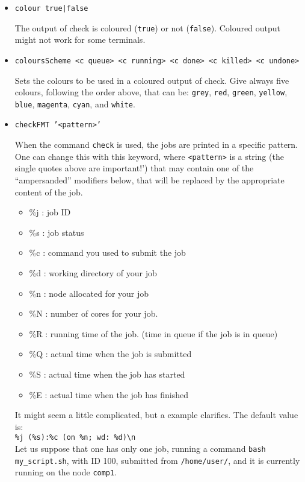 \documentclass[a4paper,12pt]{article}
\begin{document}
\begin{itemize}
\item \texttt{colour true|false}
  
  The output of check is coloured (\texttt{true}) or not (\texttt{false}).
  Coloured output might not work for some terminals.

\item \texttt{coloursScheme <c queue> <c running> <c done> <c killed> <c undone>}

  Sets the colours to be used in a coloured output of check.
  Give always five colours, following the order above, that can be:
  \texttt{grey}, \texttt{red}, \texttt{green}, \texttt{yellow}, \texttt{blue}, \texttt{magenta}, \texttt{cyan}, and \texttt{white}.

\item \texttt{checkFMT '<pattern>'}

  When the command \texttt{check} is used, the jobs are printed in a specific pattern.
  One can change this with this keyword, where \texttt{<pattern>} is a string (the single quotes above are important!') that may contain one of the ``ampersanded'' modifiers below, that will be replaced by the appropriate content of the job.

  \begin{itemize}
  \item \%j : job ID
  \item \%s : job status
  \item \%c : command you used to submit the job
  \item \%d : working directory of your job
  \item \%n : node allocated for your job
  \item \%N : number of cores for your job.
  \item \%R : running time of the job. (time in queue if the job is in queue)
  \item \%Q : actual time when the job is submitted
  \item \%S : actual time when the job has started
  \item \%E : actual time when the job has finished
  \end{itemize}

  It might seem a little complicated, but a example clarifies.
  The default value is:\\
  \texttt{\%j (\%s):\%c (on \%n; wd: \%d)\textbackslash n}\\
  Let us suppose that one has only one job, running a command \texttt{bash my\_script.sh}, with ID 100, submitted from \texttt{/home/user/}, and it is currently running on the node \texttt{comp1}.


\end{itemize}
\end{document}
